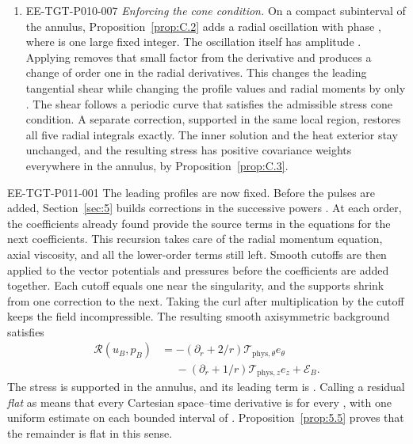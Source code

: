 \begin{enumerate}[label=\arabic*.]
 \item \begin{EESegment}{EE-TGT-P010-007}
 \emph{Enforcing the cone condition.} On a compact subinterval of the annulus,
 Proposition~\ref{prop:C.2} adds a radial oscillation with phase
 , where  is one large fixed integer. The
 oscillation itself has amplitude . Applying
  removes that small factor from the derivative and produces a
 change of order one in the radial derivatives. This changes the leading tangential shear while
 changing the profile values and radial moments by only . The
 shear follows a periodic curve that satisfies the admissible stress cone condition. A separate
 correction, supported in the same local region, restores all five radial integrals exactly. The
 inner solution and the heat exterior stay unchanged, and the resulting stress has positive
 covariance weights everywhere in the annulus, by Proposition~\ref{prop:C.3}.
 \end{EESegment}
\end{enumerate}

%
\begin{EESegment}{EE-TGT-P011-001}
The leading profiles are now fixed. Before the pulses are added, Section~\ref{sec:5} builds
corrections in the successive powers . At each order,
the coefficients already found provide the source terms in the equations for the next
coefficients. This recursion takes care of the radial momentum equation, axial viscosity, and all
the lower-order terms still left. Smooth cutoffs are then applied to the vector potentials and
pressures before the coefficients are added together. Each cutoff equals one near the singularity,
and the supports shrink from one correction to the next. Taking the curl after multiplication by
the cutoff keeps the field incompressible. The resulting smooth axisymmetric background
 satisfies
\[
 \begin{aligned}
 \mathscr R(u_B,p_B)
   & =-(\partial_r+2/r)\mathcal T_{\mathrm{phys},\theta}e_\theta \\
   & \phantom{={}}-(\partial_r+1/r)\mathcal T_{\mathrm{phys},z}e_z+\mathcal E_B.
 \end{aligned}
\]
The stress  is supported in the annulus, and its
leading term is . Calling a residual \emph{flat} as
 means that every Cartesian space--time derivative is
 for every , with one uniform estimate on
each bounded interval of . Proposition~\ref{prop:5.5} proves that the
remainder  is flat in this sense.
\end{EESegment}

